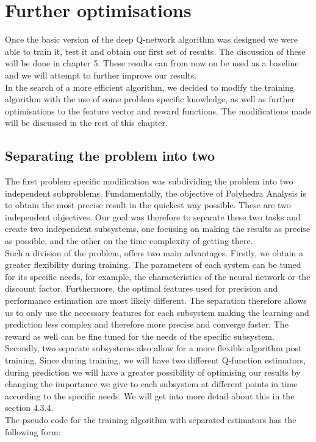 \section{Further optimisations}
Once the basic version of the deep Q-network algorithm was designed we were able to train it, test it and obtain our first set of results. The discussion of these will be done in chapter 5. These results can from now on be used as a baseline and we will attempt to further improve our results.\\
In the search of a more efficient algorithm, we decided to modify the training algorithm with the use of some problem specific knowledge, as well as further optimisations to the feature vector and reward functions. The modifications made will be discussed in the rest of this chapter.


\subsection{Separating the problem into two}
The first problem specific modification was subdividing the problem into two independent subproblems. Fundamentally, the objective of Polyhedra Analysis is to obtain the most precise result in the quickest way possible. These are two independent objectives. Our goal was therefore to separate these two tasks and create two independent subsystems, one focusing on making the results as precise as possible, and the other on the time complexity of getting there.\\
 Such a division of the problem, offers two main advantages. Firstly, we obtain a greater flexibility during training. The parameters of each system can be tuned for its specific needs, for example, the characteristics of the neural network or the discount factor. Furthermore, the optimal features used for precision and performance estimation are most likely different. The separation therefore allows us to only use the necessary features for each subsystem making the learning and prediction less complex and therefore more precise and converge faster. The reward as well can be fine tuned for the needs of the specific subsystem.\\ 
 Secondly, two separate subsystems also allow for a more flexible algorithm post training. Since during training, we will have  two different Q-function estimators, during prediction we will have a greater possibility of optimising our results by changing the importance we give to each subsystem at different points in time according to the specific needs. We will get into more detail about this in the section 4.3.4.\\
 The pseudo code for the training algorithm with separated estimators has the following form:


